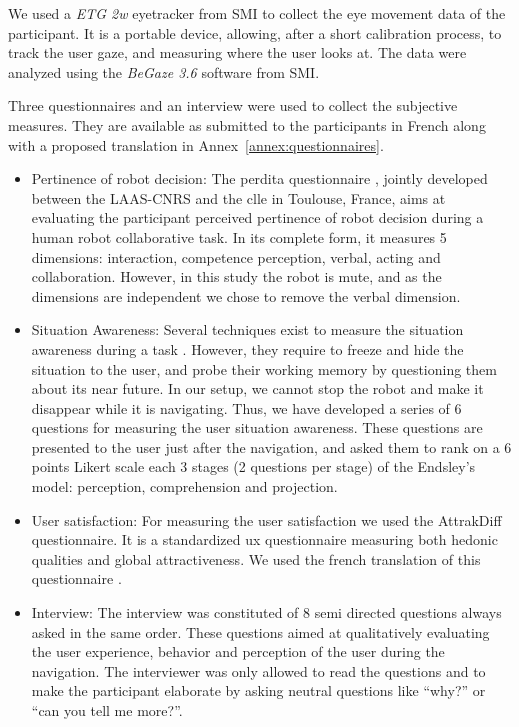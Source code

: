 \documentclass[a4paper,11pt,twoside]{StyleThese}
\begin{document}
We used a \textit{ETG 2w} eyetracker from SMI to collect the eye movement data of the participant. It is a portable device, allowing, after a short calibration process, to track the user gaze, and measuring where the user looks at. The data were analyzed using the \textit{BeGaze 3.6} software from SMI.

Three questionnaires and an interview were used to collect the subjective measures. They are available as submitted to the participants in French along with a proposed translation in Annex~\ref{annex:questionnaires}.
\begin{itemize}
\item Pertinence of robot decision: The \acrfull{perdita} questionnaire \cite{devin_evaluating_2018}, jointly developed between the LAAS-CNRS and the \acrshort{clle} in Toulouse, France, aims at evaluating the participant perceived pertinence of robot decision during a human robot collaborative task. In its complete form, it measures 5 dimensions: interaction, competence perception, verbal, acting and collaboration. However, in this study the robot is mute, and as the dimensions are independent we chose to remove the verbal dimension.
\item Situation Awareness: Several techniques exist to measure the situation awareness during a task \cite{endsley_design_1988}. However, they require to freeze and hide the situation to the user, and probe their working memory by questioning them about its near future. In our setup, we cannot stop the robot and make it disappear while it is navigating. Thus, we have developed a series of 6 questions for measuring the user situation awareness. These questions are presented to the user just after the navigation, and asked them to rank on a 6 points Likert scale each 3 stages (2 questions per stage) of the Endsley's model: perception, comprehension and projection.
\item User satisfaction: For measuring the user satisfaction we used the AttrakDiff questionnaire. It is a standardized \acrfull{ux} questionnaire measuring both hedonic qualities and global attractiveness. We used the french translation of this questionnaire \cite{lallemand_creation_2015}.
\item Interview: The interview was constituted of 8 semi directed questions always asked in the same order. These questions aimed at qualitatively evaluating the user experience, behavior and perception of the user during the navigation. The interviewer was only allowed to read the questions and to make the participant elaborate by asking neutral questions like ``why?'' or ``can you tell me more?''.
\end{itemize}
\end{document}
